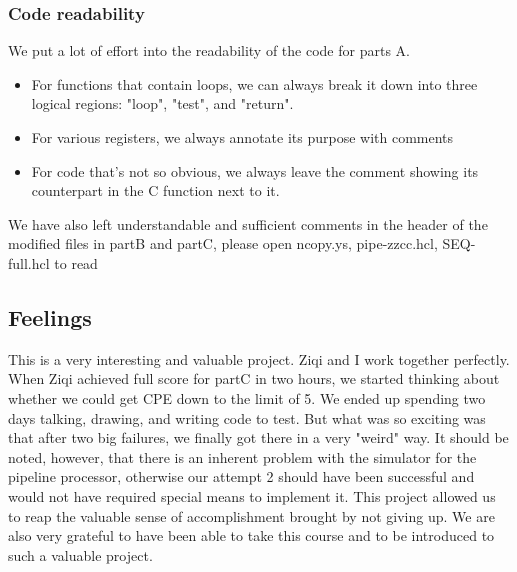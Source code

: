 \documentclass{article}
\begin{document}
\subsubsection{Code readability}
We put a lot of effort into the readability of the code for parts A.
\begin{itemize}
        \item For functions that contain loops, we can always break it down into three logical regions: "loop", "test", and "return".
        \item For various registers, we always annotate its purpose with comments
        \item For code that's not so obvious, we always leave the comment showing its counterpart in the C function next to it.
\end{itemize}
We have also left understandable and sufficient comments in the header of the modified files in partB and partC, 
please open ncopy.ys, pipe-zzcc.hcl, SEQ-full.hcl to read

\subsection{Feelings}
This is a very interesting and valuable project. Ziqi and I work together perfectly. 
When Ziqi achieved full score for partC in two hours, we started thinking about whether we could get CPE down to the limit of 5.
We ended up spending two days talking, drawing, and writing code to test.
But what was so exciting was that after two big failures, we finally got there in a very "weird" way.
It should be noted, however, that there is an inherent problem with the simulator for the pipeline processor, 
otherwise our attempt 2 should have been successful and would not have required special means to implement it.
This project allowed us to reap the valuable sense of accomplishment brought by not giving up. 
We are also very grateful to have been able to take this course and to be introduced to such a valuable project.
\end{document}
